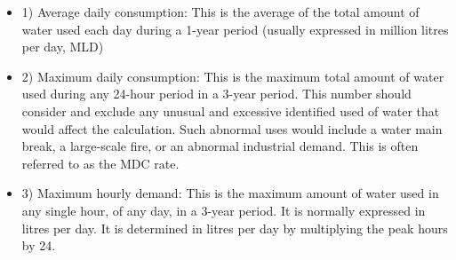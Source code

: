\begin{itemize}
	\item 1) Average daily consumption: This is the average of the total amount of water used each day during a 1-year period (usually expressed in million litres per day, MLD)
	\item 2) Maximum daily consumption: This is the maximum total amount of water used during any 24-hour period in a 3-year period. This number should consider and exclude any unusual and excessive identified used of water that would affect the calculation. Such abnormal uses would include a water main break, a large-scale fire, or an abnormal industrial demand. This is often referred to as the MDC rate.
	\item 3) Maximum hourly demand: This is the maximum amount of water used in any single hour, of any day, in a 3-year period. It is normally expressed in litres per day. It is determined in litres per day by multiplying the peak hours by 24. 





\end{itemize}
